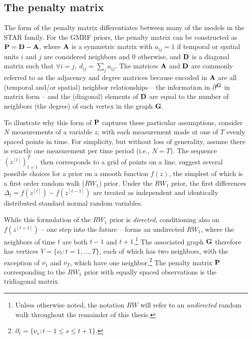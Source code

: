 \subsection{The penalty matrix} 
\label{penalty_matrix}

The form of the penalty matrix differentiates between many of the models in the STAR family. 
For the GMRF priors, the penalty matrix can be constructed as $\mathbf{P} = \mathbf{D} - \mathbf{A}$, 
where $\mathbf{A}$ is a symmetric matrix with $a_{ij} = 1$ if temporal or spatial units $i$ and $j$ 
are considered neighbors and 0 otherwise, and $\mathbf{D}$ is a diagonal matrix such that 
$\forall i = j, \: d_{ij} = \sum_j a_{ij}$. The matrices $\mathbf{A}$ and $\mathbf{D}$ are 
commonly referred to as the adjacency and degree matrices because encoded in 
$\mathbf{A}$ are all (temporal and/or spatial) neighbor relationships -- the information 
in $\partial^{\mathbf{G}}$ in matrix form -- and the (diagonal) elements of $\mathbf{D}$ 
are equal to the number of neighbors (the degree) of each vertex in the 
graph $\mathbf{G}$. 

To illustrate why this form of $\mathbf{P}$ captures these particular assumptions, 
consider $N$ measurements of a variable $z$, with each measurement made at 
one of $T$ evenly spaced points in time. For simplicity, but without loss of generality,  
assume there is exactly one measurement per time period (i.e., $N = T$).  
The sequence $(z^{[t]})_{t=1}^T$ then corresponds to a grid of points on a line. 
 suggest several possible choices for a prior on a smooth
function $f(z)$, the simplest of which is a first order random walk ($RW_1$) prior.  Under 
the $RW_1$ prior, the first differences $\Delta_t = f(z^{[t]}) - f(z^{[t-1]})$ are treated as 
independent and identically distributed standard normal random variables. 

While this formulation of the $RW_1$ prior is {\it directed}, conditioning also on 
$f(z^{[t+1]})$ -- one step into the future -- forms an undirected $RW_1$, where 
the neighbors of time $t$ are both $t-1$ and $t+1$.\footnote{Unless otherwise 
noted, the notation $RW$ will refer to an {\it undirected} random walk throughout 
the remainder of this thesis.} The associated graph $\mathbf{G}$ therefore has vertices 
$V=\{\nu_t : t=1,\dots,T\}$, each of which has two neighbors, with the exception of 
$\nu_1$ and $\nu_T$, which have one neighbor.\footnote{$\partial_t = \{\nu_{s} : 
t - 1 \leq s \leq t + 1\}.$}  The penalty matrix $\mathbf{P}$ corresponding to the $RW_1$ 
prior with equally spaced observations is the tridiagonal matrix

